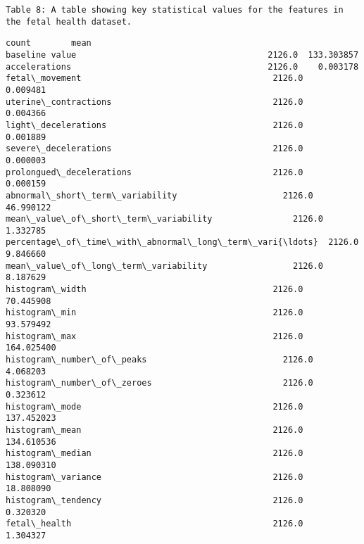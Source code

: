 \documentclass[11pt]{article}
\makeatletter
\newcommand{\boxspacing}{\kern\kvtcb@left@rule\kern\kvtcb@boxsep}
\makeatother
\begin{document}
    \begin{Verbatim}[commandchars=\\\{\}]
Table 8: A table showing key statistical values for the features in the fetal health dataset.
    \end{Verbatim}

            \begin{tcolorbox}[breakable, size=fbox, boxrule=.5pt, pad at break*=1mm, opacityfill=0]
{\boxspacing}
\begin{Verbatim}[commandchars=\\\{\}]
                                                     count        mean  
baseline value                                      2126.0  133.303857
accelerations                                       2126.0    0.003178
fetal\_movement                                      2126.0    0.009481
uterine\_contractions                                2126.0    0.004366
light\_decelerations                                 2126.0    0.001889
severe\_decelerations                                2126.0    0.000003
prolongued\_decelerations                            2126.0    0.000159
abnormal\_short\_term\_variability                     2126.0   46.990122
mean\_value\_of\_short\_term\_variability                2126.0    1.332785
percentage\_of\_time\_with\_abnormal\_long\_term\_vari{\ldots}  2126.0    9.846660
mean\_value\_of\_long\_term\_variability                 2126.0    8.187629
histogram\_width                                     2126.0   70.445908
histogram\_min                                       2126.0   93.579492
histogram\_max                                       2126.0  164.025400
histogram\_number\_of\_peaks                           2126.0    4.068203
histogram\_number\_of\_zeroes                          2126.0    0.323612
histogram\_mode                                      2126.0  137.452023
histogram\_mean                                      2126.0  134.610536
histogram\_median                                    2126.0  138.090310
histogram\_variance                                  2126.0   18.808090
histogram\_tendency                                  2126.0    0.320320
fetal\_health                                        2126.0    1.304327


\end{Verbatim}
\end{tcolorbox}
\end{document}
